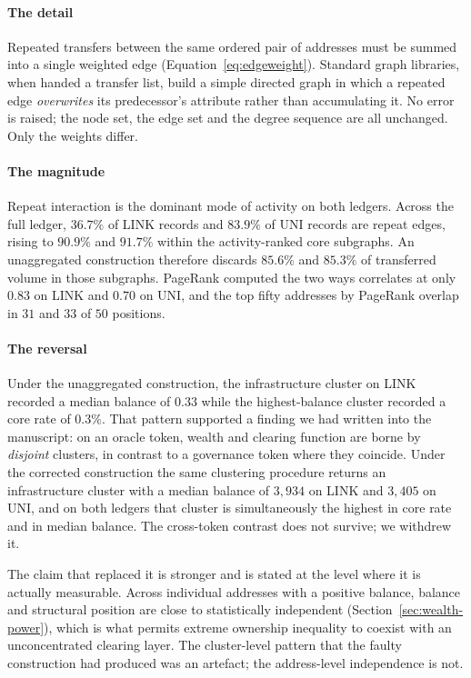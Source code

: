 \documentclass[final,5p,times]{elsarticle}
\begin{document}
\paragraph{The detail}
Repeated transfers between the same ordered pair of addresses must be summed
into a single weighted edge (Equation~\ref{eq:edgeweight}). Standard graph
libraries, when handed a transfer list, build a simple directed graph in
which a repeated edge \emph{overwrites} its predecessor's attribute rather
than accumulating it. No error is raised; the node set, the edge set and the
degree sequence are all unchanged. Only the weights differ.

\paragraph{The magnitude}
Repeat interaction is the dominant mode of activity on both ledgers. Across
the full ledger, $36.7\%$ of LINK records and $83.9\%$ of UNI records are
repeat edges, rising to $90.9\%$ and $91.7\%$ within the activity-ranked core
subgraphs. An unaggregated construction therefore discards $85.6\%$ and
$85.3\%$ of transferred volume in those subgraphs. PageRank computed the two ways correlates at only $0.83$ on LINK and $0.70$
on UNI, and the top fifty addresses by PageRank overlap in $31$ and $33$ of
$50$ positions.

\paragraph{The reversal}
Under the unaggregated construction, the infrastructure cluster on LINK
recorded a median balance of $0.33$ while the highest-balance cluster
recorded a core rate of $0.3\%$. That pattern supported a finding we had
written into the manuscript: on an oracle token, wealth and clearing
function are borne by \emph{disjoint} clusters, in contrast to a governance
token where they coincide. Under the corrected construction the same
clustering procedure returns an infrastructure cluster with a median balance
of $3{,}934$ on LINK and $3{,}405$ on UNI, and on both ledgers that cluster
is simultaneously the highest in core rate and in median balance. The
cross-token contrast does not survive; we withdrew it.

The claim that replaced it is stronger and is stated at the level where it
is actually measurable. Across individual addresses with a positive balance,
balance and structural position are close to statistically independent
(Section~\ref{sec:wealth-power}), which is what permits extreme ownership
inequality to coexist with an unconcentrated clearing layer. The
cluster-level pattern that the faulty construction had produced was an
artefact; the address-level independence is not.
\end{document}
